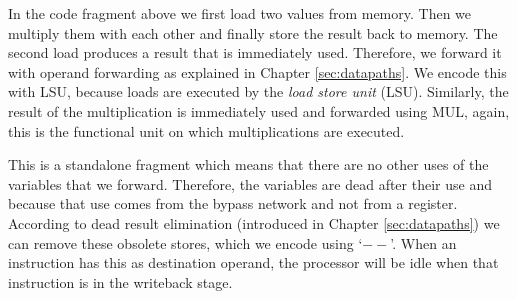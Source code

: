 In the code fragment above we first load two values from memory. Then we multiply them with each other and finally store the result back to memory. The second load produces a result that is immediately used. Therefore, we forward it with operand forwarding as explained in Chapter \ref{sec:datapaths}. We encode this with LSU, because loads are executed by the \emph{load store unit} (LSU). Similarly, the result of the multiplication is immediately used and forwarded using MUL, again, this is the functional unit on which multiplications are executed.

This is a standalone fragment which means that there are no other uses of the variables that we forward. Therefore, the variables are dead after their use and because that use comes from the bypass network and not from a register. According to dead result elimination (introduced in Chapter \ref{sec:datapaths}) we can remove these obsolete stores, which we encode using `$--$'. When an instruction has this as destination operand, the processor will be idle when that instruction is in the writeback stage. 










